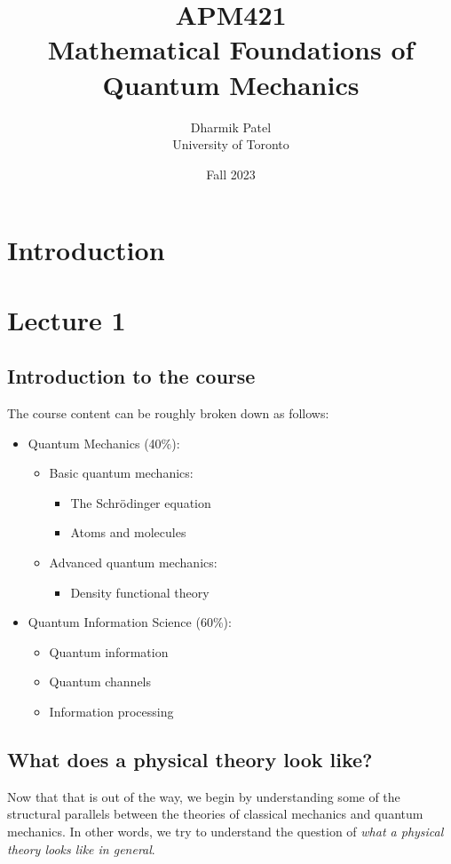 \documentclass[10pt,a4paper]{report}
\author{Dharmik Patel \\ University of Toronto}
\title{APM421 \\Mathematical Foundations of Quantum Mechanics}
\date{Fall 2023}
\begin{document}
\maketitle
\tableofcontents


\section{Introduction}

\section{Lecture 1}
\subsection{Introduction to the course}
The course content can be roughly broken down as follows:
\begin{itemize}
    \item Quantum Mechanics (40\%):
    \begin{itemize}
        \item Basic quantum mechanics:
        \begin{itemize}
            \item The Schrödinger equation
            \item Atoms and molecules
        \end{itemize}
        \item Advanced quantum mechanics:
        \begin{itemize}
            \item Density functional theory
        \end{itemize}
    \end{itemize}
    \item Quantum Information Science (60\%):
    \begin{itemize}
        \item Quantum information
        \item Quantum channels
        \item Information processing
    \end{itemize}
\end{itemize}

\subsection{What does a physical theory look like?}
Now that that is out of the way, we begin by understanding some of the structural parallels between the theories of classical mechanics and quantum mechanics. In other words, we try to understand the question of \textit{what a physical theory looks like in general}.
\end{document}
